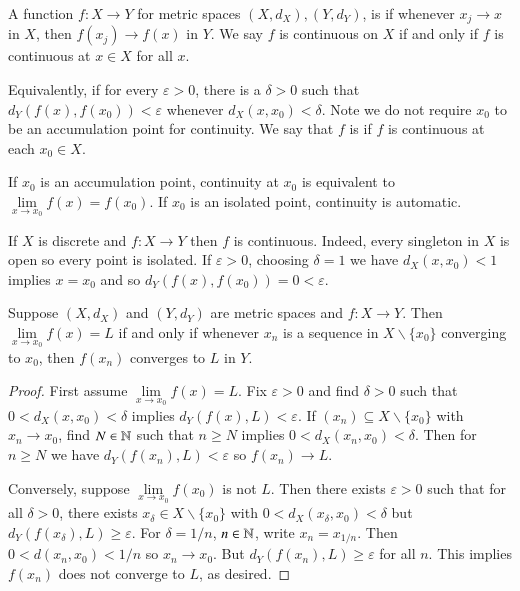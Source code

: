 \begin{defn}
    A function $f:X\rightarrow Y$ for metric spaces $(X,d_X), (Y,d_Y)$, is  if whenever $x_j \rightarrow x$ in $X$, then $f(x_j)\rightarrow f(x)$ in $Y$. We say $f$ is continuous on $X$ if and only if $f$ is continuous at $x \in X$ for all $x$.

    Equivalently,  if for every $\varepsilon > 0$, there is a $\delta > 0$ such that $d_Y(f(x),f(x_0)) < \varepsilon$ whenever $d_X(x,x_0) < \delta$. Note we do not require $x_0$ to be an accumulation point for continuity. We say that $f$ is  if $f$ is continuous at each $x_0 \in X$.
\end{defn}

If $x_0$ is an accumulation point, continuity at $x_0$ is equivalent to $\lim\limits_{x\rightarrow x_0}f(x) = f(x_0)$. If $x_0$ is an isolated point, continuity is automatic.

\begin{eg}
    If $X$ is discrete and $f:X\rightarrow Y$ then $f$ is continuous. Indeed, every singleton in $X$ is open so every point is isolated. If $\varepsilon > 0$, choosing $\delta = 1$ we have $d_X(x,x_0) < 1$ implies $x = x_0$ and so $d_Y(f(x),f(x_0)) = 0 < \varepsilon$.
\end{eg}


\begin{prop}
    Suppose $(X,d_X)$ and $(Y,d_Y)$ are metric spaces and $f:X\rightarrow Y$. Then $\lim\limits_{x\rightarrow x_0}f(x) = L$ if and only if whenever $x_n$ is a sequence in $X\backslash\{x_0\}$ converging to $x_0$, then $f(x_n)$ converges to $L$ in $Y$.
\end{prop}
\begin{proof}
    First assume $\lim\limits_{x\rightarrow x_0}f(x) = L$. Fix $\varepsilon > 0$ and find $\delta > 0$ such that $0 < d_X(x,x_0) < \delta$ implies $d_Y(f(x),L) < \varepsilon$. If $(x_n) \subseteq X\backslash\{x_0\}$ with $x_n\rightarrow x_0$, find $N \in \mathbb N$ such that $n \geq N$ implies $0 < d_X(x_n,x_0) < \delta$. Then for $n \geq N$ we have $d_Y(f(x_n),L) < \varepsilon$ so $f(x_n)\rightarrow L$. 

    Conversely, suppose $\lim\limits_{x\rightarrow x_0}f(x_0)$ is not $L$. Then there exists $\varepsilon > 0$ such that for all $\delta > 0$, there exists $x_{\delta} \in X\backslash\{x_0\}$ with $0 < d_X(x_{\delta},x_0) < \delta$ but $d_Y(f(x_{\delta}),L) \geq \varepsilon$. For $\delta= 1/n$, $n \in \mathbb N$, write $x_n = x_{1/n}$. Then $0 < d(x_n,x_0) < 1/n$ so $x_n\rightarrow x_0$. But $d_Y(f(x_n),L) \geq \varepsilon$ for all $n$. This implies $f(x_n)$ does not converge to $L$, as desired.
\end{proof}


